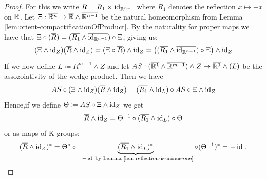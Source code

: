 \begin{proof}
    For this we write $R=R_1\times \operatorname{\mathrm{id}}_{\mathbb{R}^{n-1}}$ where $R_1$ denotes the reflection $x\mapsto -x$ on $\mathbb{R}$. Let $\Xi:\overline{\mathbb{R}^n}\to \overline{\mathbb{R}}\wedge \overline{\mathbb{R}^{n-1}}$ be the natural homeomorphism from Lemma \ref{lem:orient-compactificationOfProduct}. By the naturality for proper maps we have that $  \Xi\circ (\overline{R})=(\overline{R_1}\wedge \overline{\operatorname{\mathrm{id}}_{\mathbb{R}^{n-1}}})\circ \Xi$, giving us:
    \begin{equation*}
     (\Xi\wedge \operatorname{\mathrm{id}}_Z)(\overline{R}\wedge \operatorname{\mathrm{id}}_Z)=(\Xi\circ \overline{R})\wedge \operatorname{\mathrm{id}}_Z=\big((\overline{R_1}\wedge \overline{\operatorname{\mathrm{id}}_{\mathbb{R}^{n-1}}})\circ \Xi \big)\wedge \operatorname{\mathrm{id}}_Z 
    \end{equation*}
    If we now define $L\coloneq \overline{R^{m-1}}\wedge Z$ and let $AS:(\overline{\mathbb{R}^1}\wedge \overline{\mathbb{R}^{m-1}})\wedge Z\to \overline{\mathbb{R}^1}\wedge (L)$ be the assozoiativity of the wedge product. Then we have 
    \begin{equation*}
       AS\circ (\Xi\wedge \operatorname{\mathrm{id}}_Z)(\overline{R}\wedge \operatorname{\mathrm{id}}_Z)=(\overline{R_1}\wedge \operatorname{\mathrm{id}}_L)\circ AS\circ \Xi\wedge \operatorname{\mathrm{id}}_Z
    \end{equation*}
Hence,if we define $\Theta \coloneq AS\circ \Xi\wedge \operatorname{\mathrm{id}}_Z$ we get
\begin{equation*}
    \overline{R}\wedge \operatorname{\mathrm{id}}_Z=\Theta^{-1}\circ (\overline{R_1}\wedge \operatorname{\mathrm{id}}_L)\circ \Theta
\end{equation*} or as maps of K-groups:
\begin{equation*}   ( \overline{R}\wedge \operatorname{\mathrm{id}}_Z)^*=\Theta^*\circ \underbrace{(\overline{R_1}\wedge \operatorname{\mathrm{id}}_L)^*}_{=-\operatorname{\mathrm{id}}\text{ by Lemma \ref{lem:reflection-is-minus-one}}}\circ (\Theta^{-1})^*
   =-\operatorname{\mathrm{id}}\,.
\end{equation*}
\end{proof}

